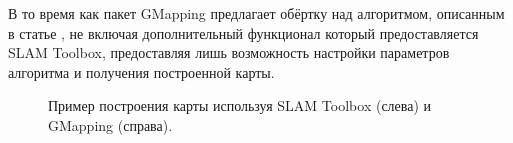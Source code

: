 
В то время как пакет GMapping предлагает обёртку над алгоритмом,
описанным в статье \cite{grisetti2005improving}, не включая дополнительный
функционал который предоставляется SLAM Toolbox, предоставляя лишь возможность
настройки параметров алгоритма и получения построенной карты.

\begin{figure}[h]
\centering
	\caption{Пример построения карты используя SLAM Toolbox (слева) и GMapping
	(справа).}
	\label{ris:map_example}
\end{figure}


